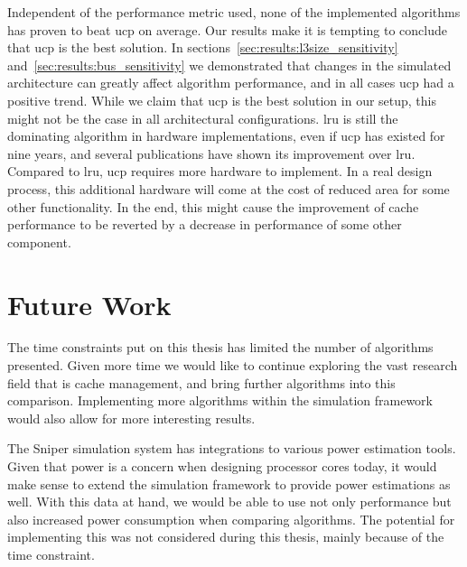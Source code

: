 Independent of the performance metric used, none of the implemented algorithms has proven to beat \gls{ucp} on average.
Our results make it is tempting to conclude that \gls{ucp} is the best solution.
In sections~\ref{sec:results:l3size_sensitivity} and~\ref{sec:results:bus_sensitivity} we demonstrated that changes in the simulated architecture can greatly affect algorithm performance, and in all cases \gls{ucp} had a positive trend.
While we claim that \gls{ucp} is the best solution in our setup, this might not be the case in all architectural configurations.
\gls{lru} is still the dominating algorithm in hardware implementations, even if \gls{ucp} has existed for nine years, and several publications have shown its improvement over \gls{lru}.
Compared to \gls{lru}, \gls{ucp} requires more hardware to implement. 
In a real design process, this additional hardware will come at the cost of reduced area for some other functionality.
In the end, this might cause the improvement of cache performance to be reverted by a decrease in performance of some other component.

\section{Future Work}

The time constraints put on this thesis has limited the number of algorithms presented.
Given more time we would like to continue exploring the vast research field that is cache management, and bring further algorithms into this comparison.
Implementing more algorithms within the simulation framework would also allow for more interesting results.

The Sniper simulation system has integrations to various power estimation tools.
Given that power is a concern when designing processor cores today, it would make sense to extend the simulation framework to provide power estimations as well.
With this data at hand, we would be able to use not only performance but also increased power consumption when comparing algorithms.
The potential for implementing this was not considered during this thesis, mainly because of the time constraint.
